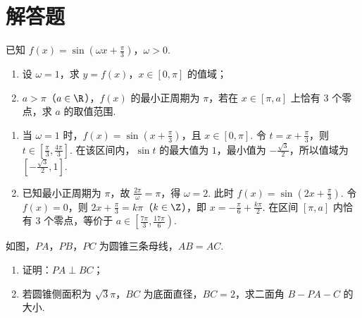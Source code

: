 \section{解答题}

\begin{problem}
已知 \(f(x)=\sin\left(\omega x+\frac{\pi}{3}\right)\)，\(\omega>0\).

\begin{enumerate}
\item 设 \(\omega=1\)，求 \(y=f(x)\)，\(x\in[0,\pi]\) 的值域；
\item \(a>\pi\)（\(a\in\R\)），\(f(x)\) 的最小正周期为 \(\pi\)，若在 \(x\in[\pi,a]\) 上恰有 \(3\) 个零点，求 \(a\) 的取值范围.
\end{enumerate}
\end{problem}

\begin{solution}
\begin{enumerate}
\item 当 \(\omega=1\) 时，\(f(x)=\sin\left(x+\frac{\pi}{3}\right)\)，且 \(x\in[0,\pi]\). 令 \(t=x+\frac{\pi}{3}\)，则 \(t\in\left[\frac{\pi}{3},\frac{4\pi}{3}\right]\). 在该区间内，\(\sin t\) 的最大值为 \(1\)，最小值为 \(-\frac{\sqrt3}{2}\)，所以值域为 \(\left[-\frac{\sqrt3}{2},1\right]\).

\item 已知最小正周期为 \(\pi\)，故 \(\frac{2\pi}{\omega}=\pi\)，得 \(\omega=2\). 此时 \(f(x)=\sin\left(2x+\frac{\pi}{3}\right)\). 令 \(f(x)=0\)，则 \(2x+\frac{\pi}{3}=k\pi\)（\(k\in\Z\)），即 \(x=-\frac{\pi}{6}+\frac{k\pi}{2}\). 在区间 \([\pi,a]\) 内恰有 \(3\) 个零点，等价于 \(a\in\left[\frac{7\pi}{3},\frac{17\pi}{6}\right)\).
\end{enumerate}
\end{solution}

\begin{problem}
如图，\(PA\)，\(PB\)，\(PC\) 为圆锥三条母线，\(AB=AC\).

\begin{enumerate}
\item 证明：\(PA\perp BC\)；
\item 若圆锥侧面积为 \(\sqrt3\pi\)，\(BC\) 为底面直径，\(BC=2\)，求二面角 \(B-PA-C\) 的大小.
\end{enumerate}

\end{problem}

